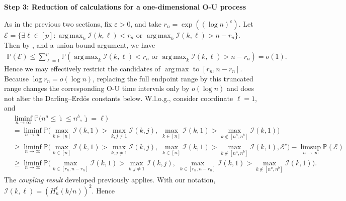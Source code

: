 \documentclass[10pt]{article}
\DeclareMathOperator*{\argmax}{arg\,max}
\def\P{\mathbb{P}}
\def\I{\mathscr{I}}
\theoremstyle{definition}
\theoremstyle{remark}
\begin{document}
\begin{center}
    \textbf{Step 3: Reduction of calculations for a one-dimensional O-U process}
\end{center}
As in the previous two sections, fix $\varepsilon > 0$, and take $r_n = \exp((\log n)^{\varepsilon})$. Let $\mathcal{E} = \{\exists \ell \in [p]: \argmax_k \I(k,\ell) < r_n \text{ or } \argmax_k \I(k,\ell) > n - r_n\}$. Then by \cite[proof of Theorem A.4.2]{csorgo1997limit}, and a union bound argument, we have
\begin{align*}
    \P(\mathcal{E}) \leq \sum_{\ell = 1}^p \P(\argmax_k \I(k,\ell) < r_n \text{ or } \argmax_k \I(k,\ell) > n - r_n) = o(1).
\end{align*}
Hence we may effectively restrict the candidates of $\argmax$ to $[r_n, n - r_n]$. Because $\log r_n=o(\log n)$, replacing the full endpoint range by this truncated range changes the corresponding O-U time intervals only by $o(\log n)$ and does not alter the Darling--Erd\"os constants below. W.l.o.g., consider coordinate $\ell = 1$, and
\begin{align*}
    & \liminf_{n\to\infty} \mathbb{P}\big( n^{a} \leq \hat{\imath} \leq n^{b}, \hat{\jmath} = \ell \big) \\
    & =  \liminf_{n\to\infty}\mathbb{P}\Big(\max_{k \in [n]}\I(k,1) > \max_{k,j\neq 1}\I(k,j), \; \max_{k \in [n]}\I(k,1) > \max_{k \notin [n^a,n^b]}\I(k,1) \Big) \\
    & \geq \liminf_{n\to\infty}\mathbb{P}\Big(\max_{k \in [n]}\I(k,1) > \max_{k,j\neq 1}\I(k,j), \; \max_{k \in [n]}\I(k,1) > \max_{k \notin [n^a,n^b]}\I(k,1),\mathcal{E}^c \Big) - \limsup_{n\to\infty}\P(\mathcal{E})\\
    & \geq \liminf_{n\to\infty}\mathbb{P}\Big(\max_{k \in [r_n, n - r_n]}\I(k,1) > \max_{k,j\neq 1}\I(k,j), \; \max_{k \in [r_n, n - r_n]}\I(k,1) > \max_{k \notin [n^a,n^b]}\I(k,1)\Big).
\end{align*}
The \textit{coupling result} developed previously applies. With our notation, $\I(k,\ell) = (H_n^\ell(k/n))^2$. Hence
\end{document}
